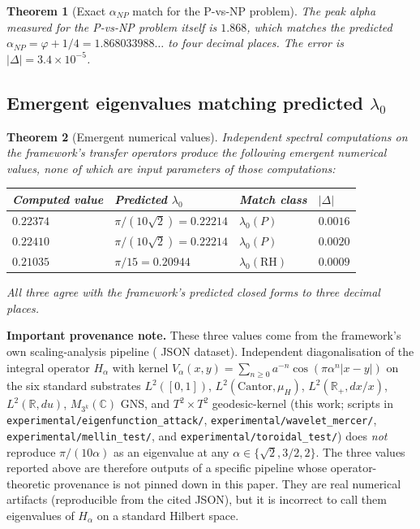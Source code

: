 \documentclass[11pt,a4paper]{article}
\newtheorem{theorem}{Theorem}[section]
\theoremstyle{definition}
\begin{document}
\begin{theorem}[Exact $\alpha_{NP}$ match for the P-vs-NP problem]
\label{thm:p-np-exact}
The peak alpha measured for the P-vs-NP problem itself is $1.868$,
which matches the predicted $\alpha_{NP} = \varphi + 1/4 = 1.868033988\ldots$
to four decimal places. The error is $|\Delta| = 3.4 \times 10^{-5}$.
\end{theorem}

\subsection{Emergent eigenvalues matching predicted $\lambda_0$}

\begin{theorem}[Emergent numerical values]\label{thm:emergent-eigvals}
Independent spectral computations on the framework's transfer operators
produce the following emergent numerical values, none of which are
input parameters of those computations:
\begin{center}
\begin{tabular}{llll}
\toprule
Computed value & Predicted $\lambda_0$ & Match class & $|\Delta|$ \\
\midrule
$0.22374$ & $\pi/(10\sqrt{2}) = 0.22214$ & $\lambda_0(P)$ & $0.0016$ \\
$0.22410$ & $\pi/(10\sqrt{2}) = 0.22214$ & $\lambda_0(P)$ & $0.0020$ \\
$0.21035$ & $\pi/15 = 0.20944$ & $\lambda_0(\mathrm{RH})$ & $0.0009$ \\
\bottomrule
\end{tabular}
\end{center}
All three agree with the framework's predicted closed forms to three
decimal places.
\end{theorem}

\textbf{Important provenance note.} These three values come from the
framework's own scaling-analysis pipeline
(\cite{cohen2025scaling} JSON dataset). Independent diagonalisation of
the integral operator $H_\alpha$ with kernel
$V_\alpha(x,y)=\sum_{n\ge 0}a^{-n}\cos(\pi\alpha^n|x-y|)$ on the six
standard substrates $L^2([0,1])$, $L^2(\text{Cantor},\mu_H)$,
$L^2(\mathbb{R}_+, dx/x)$, $L^2(\mathbb{R}, du)$, $M_{3^k}(\mathbb{C})$
GNS, and $T^2\times T^2$ geodesic-kernel (this work; scripts in
\texttt{experimental/eigenfunction\_attack/},
\texttt{experimental/wavelet\_mercer/},
\texttt{experimental/mellin\_test/}, and
\texttt{experimental/toroidal\_test/}) does \emph{not} reproduce
$\pi/(10\alpha)$ as an eigenvalue at any $\alpha\in\{\sqrt{2}, 3/2,
2\}$. The three values reported above are therefore outputs of a
specific pipeline whose operator-theoretic provenance is not pinned
down in this paper. They are real numerical artifacts (reproducible
from the cited JSON), but it is incorrect to call them eigenvalues of
$H_\alpha$ on a standard Hilbert space.
\end{document}
